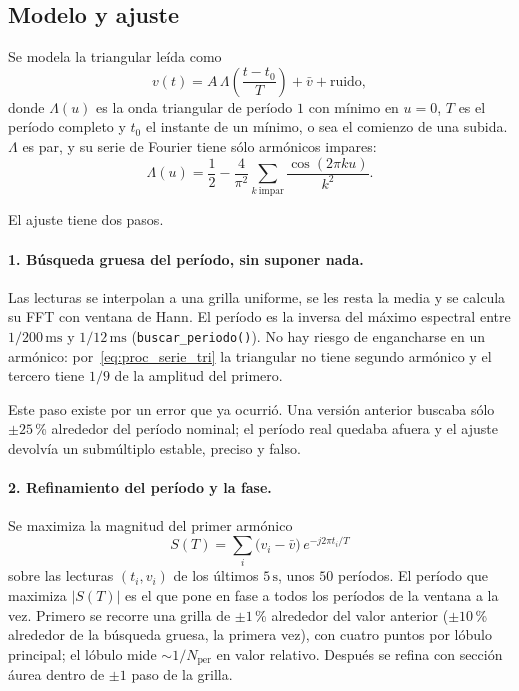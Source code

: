 \subsection{Modelo y ajuste}

Se modela la triangular leída como
\begin{equation}
  v(t) = A\,\Lambda\!\left(\frac{t - t_0}{T}\right) + \bar v + \text{ruido},
  \label{eq:proc_modelo_tri}
\end{equation}
donde $\Lambda(u)$ es la onda triangular de período $1$ con mínimo en
$u = 0$, $T$ es el período completo y $t_0$ el instante de un mínimo, o sea
el comienzo de una subida. $\Lambda$ es par, y su serie de Fourier tiene
sólo armónicos impares:
\begin{equation}
  \Lambda(u) = \frac{1}{2} - \frac{4}{\pi^2}\sum_{k\ \text{impar}}
  \frac{\cos(2\pi k u)}{k^2}.
  \label{eq:proc_serie_tri}
\end{equation}

El ajuste tiene dos pasos.

\paragraph{1. Búsqueda gruesa del período, sin suponer nada.}
Las lecturas se interpolan a una grilla uniforme, se les resta la media y
se calcula su FFT con ventana de Hann. El período es la inversa del máximo
espectral entre $1/200\,\text{ms}$ y $1/12\,\text{ms}$
(\texttt{buscar\_periodo()}). No hay riesgo de engancharse en un armónico:
por~\eqref{eq:proc_serie_tri} la triangular no tiene segundo armónico y el
tercero tiene $1/9$ de la amplitud del primero.

Este paso existe por un error que ya ocurrió. Una versión anterior buscaba
sólo $\pm 25$\,\% alrededor del período nominal; el período real quedaba
afuera y el ajuste devolvía un submúltiplo estable, preciso y falso.

\paragraph{2. Refinamiento del período y la fase.}
Se maximiza la magnitud del primer armónico
\begin{equation}
  S(T) = \sum_{i} \bigl(v_i - \bar v\bigr)\, e^{-j2\pi t_i/T}
  \label{eq:proc_armonico}
\end{equation}
sobre las lecturas $(t_i, v_i)$ de los últimos $5\,\text{s}$, unos $50$
períodos. El período que maximiza $\lvert S(T)\rvert$ es el que pone en fase
a todos los períodos de la ventana a la vez. Primero se recorre una grilla
de $\pm 1$\,\% alrededor del valor anterior ($\pm 10$\,\% alrededor de la
búsqueda gruesa, la primera vez), con cuatro puntos por lóbulo
principal; el lóbulo mide $\sim 1/N_\text{per}$ en valor relativo. Después
se refina con sección áurea dentro de $\pm 1$ paso de la grilla.


